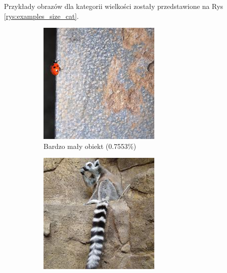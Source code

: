 Przykłady obrazów dla kategorii wielkości zostały przedstawione na Rys \ref{rys:examples_size_cat}.

\begin{figure}[h]
	\centering
	\begin{subfigure}[b]{0.3\textwidth}
		\includegraphics[width=.9\textwidth]{img/examples/size_category_verysmall}
		\caption{Bardzo mały obiekt (0.7553\%)}  \label{}
	\end{subfigure}
	\begin{subfigure}[b]{0.3\textwidth}
		\includegraphics[width=.9\textwidth]{img/examples/size_category_small}

\end{subfigure}
\end{figure}
